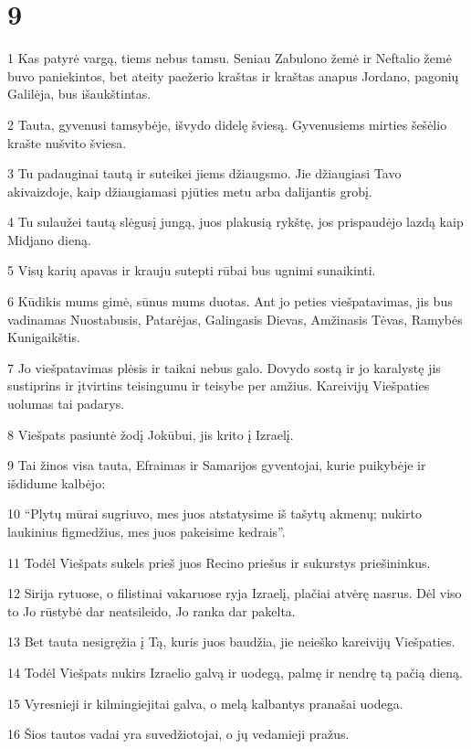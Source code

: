 \chapter{9}


\par 1 Kas patyrė vargą, tiems nebus tamsu. Seniau Zabulono žemė ir Neftalio žemė buvo paniekintos, bet ateity paežerio kraštas ir kraštas anapus Jordano, pagonių Galilėja, bus išaukštintas. 
\par 2 Tauta, gyvenusi tamsybėje, išvydo didelę šviesą. Gyvenusiems mirties šešėlio krašte nušvito šviesa. 
\par 3 Tu padauginai tautą ir suteikei jiems džiaugsmo. Jie džiaugiasi Tavo akivaizdoje, kaip džiaugiamasi pjūties metu arba dalijantis grobį. 
\par 4 Tu sulaužei tautą slėgusį jungą, juos plakusią rykštę, jos prispaudėjo lazdą kaip Midjano dieną. 
\par 5 Visų karių apavas ir krauju sutepti rūbai bus ugnimi sunaikinti. 
\par 6 Kūdikis mums gimė, sūnus mums duotas. Ant jo peties viešpatavimas, jis bus vadinamas Nuostabusis, Patarėjas, Galingasis Dievas, Amžinasis Tėvas, Ramybės Kunigaikštis. 
\par 7 Jo viešpatavimas plėsis ir taikai nebus galo. Dovydo sostą ir jo karalystę jis sustiprins ir įtvirtins teisingumu ir teisybe per amžius. Kareivijų Viešpaties uolumas tai padarys. 
\par 8 Viešpats pasiuntė žodį Jokūbui, jis krito į Izraelį. 
\par 9 Tai žinos visa tauta, Efraimas ir Samarijos gyventojai, kurie puikybėje ir išdidume kalbėjo: 
\par 10 “Plytų mūrai sugriuvo, mes juos atstatysime iš tašytų akmenų; nukirto laukinius figmedžius, mes juos pakeisime kedrais”. 
\par 11 Todėl Viešpats sukels prieš juos Recino priešus ir sukurstys priešininkus. 
\par 12 Sirija rytuose, o filistinai vakaruose ryja Izraelį, plačiai atvėrę nasrus. Dėl viso to Jo rūstybė dar neatsileido, Jo ranka dar pakelta. 
\par 13 Bet tauta nesigręžia į Tą, kuris juos baudžia, jie neieško kareivijų Viešpaties. 
\par 14 Todėl Viešpats nukirs Izraelio galvą ir uodegą, palmę ir nendrę tą pačią dieną. 
\par 15 Vyresnieji ir kilmingieji­tai galva, o melą kalbantys pranašai­ uodega. 
\par 16 Šios tautos vadai yra suvedžiotojai, o jų vedamieji pražus. 
